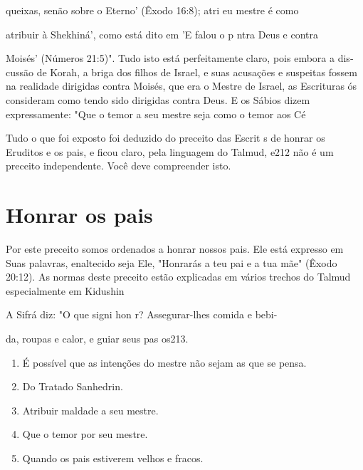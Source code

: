 queixas, senão sobre o Eterno' (Êxodo 16:8); atri eu mestre é como

atribuir à Shekhiná', como está dito em 'E falou o p ntra Deus e contra

Moisés' (Números 21:5)". Tudo isto está perfeitamente claro, pois embora
a dis­cussão de Korah, a briga dos filhos de Israel, e suas acusações e
suspeitas fos­sem na realidade dirigidas contra Moisés, que era o Mestre
de Israel, as Escritu­ras ós consideram como tendo sido dirigidas contra
Deus. E os Sábios dizem expressamente: "Que o temor a seu mestre seja
como o temor aos Cé

Tudo o que foi exposto foi deduzido do preceito das Escrit s de honrar
os Eruditos e os pais, e ficou claro, pela linguagem do Talmud, e212 não
é um preceito independente. Você deve compreender isto.

\section{Honrar os pais}

Por este preceito somos ordenados a honrar nossos pais. Ele está
ex­presso em Suas palavras, enaltecido seja Ele, "Honrarás a teu pai e a
tua mãe" (Êxodo 20:12). As normas deste preceito estão explicadas em
vários trechos do Talmud especialmente em Kidushin

A Sifrá diz: "O que signi hon r? Assegurar-lhes comida e bebi-

da, roupas e calor, e guiar seus pas os213.


\begin{enumerate}
\def\labelenumi{\arabic{enumi}.}
\setcounter{enumi}{208}
\item
 
 É possível que as intenções do mestre não sejam as que se pensa.
 
\item
 
 Do Tratado Sanhedrin.
 
\item
 
 Atribuir maldade a seu mestre.
 
\item
 
 Que o temor por seu mestre.
 
\item
 
 Quando os pais estiverem velhos e fracos.
 
\end{enumerate}


